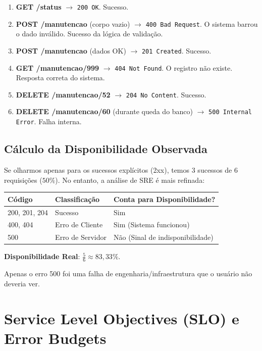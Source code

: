 \documentclass[12pt,a4paper,twoside]{report}
\begin{document}
\begin{enumerate}
    \item \textbf{GET /status} $\rightarrow$ \texttt{200 OK}. Sucesso.
    \item \textbf{POST /manutencao} (corpo vazio) $\rightarrow$ \texttt{400 Bad Request}. O sistema barrou o dado inválido. Sucesso da lógica de validação.
    \item \textbf{POST /manutencao} (dados OK) $\rightarrow$ \texttt{201 Created}. Sucesso.
    \item \textbf{GET /manutencao/999} $\rightarrow$ \texttt{404 Not Found}. O registro não existe. Resposta correta do sistema.
    \item \textbf{DELETE /manutencao/52} $\rightarrow$ \texttt{204 No Content}. Sucesso.
    \item \textbf{DELETE /manutencao/60} (durante queda do banco) $\rightarrow$ \texttt{500 Internal Error}. Falha interna.
\end{enumerate}

\subsection{Cálculo da Disponibilidade Observada}

Se olharmos apenas para os sucessos explícitos (2xx), temos 3 sucessos de 6 requisições ($50\%$). No entanto, a análise de SRE é mais refinada:

\begin{table}[h]
\centering
\begin{tabular}{@{}lll@{}}
\toprule
\textbf{Código} & \textbf{Classificação} & \textbf{Conta para Disponibilidade?} \\ \midrule
200, 201, 204   & Sucesso                & Sim                                 \\
400, 404        & Erro de Cliente        & Sim (Sistema funcionou)            \\
500             & Erro de Servidor       & Não (Sinal de indisponibilidade)   \\ \bottomrule
\end{tabular}
\end{table}

\textbf{Disponibilidade Real}: $\frac{5}{6} \approx 83,33\%$.

Apenas o erro 500 foi uma falha de engenharia/infraestrutura que o usuário não deveria ver.

\section{Service Level Objectives (SLO) e Error Budgets}
\end{document}
